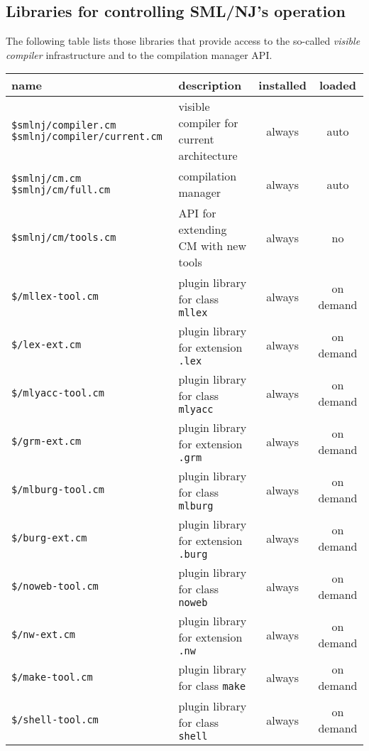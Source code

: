 \subsection{Libraries for controlling SML/NJ's operation}

The following table lists those libraries that provide access to the
so-called {\em visible compiler} infrastructure and to the compilation
manager API.

\begin{small}
\begin{center}
\begin{tabular}{p{2.3in}||p{2.5in}|c|c}
name & description & installed & loaded \\
\hline\hline
{\tt \$smlnj/compiler.cm} \newline
{\tt \$smlnj/compiler/current.cm} & visible compiler for current
architecture & always & auto \\
\hline\hline
{\tt \$smlnj/cm.cm} \newline
{\tt \$smlnj/cm/full.cm} & compilation manager & always & auto \\
\hline
{\tt \$smlnj/cm/tools.cm} & API for extending CM with new tools &
always & no \\
\hline\hline
{\tt \$/mllex-tool.cm} & plugin library for class {\tt mllex} & always
& on demand \\
\hline
{\tt \$/lex-ext.cm} & plugin library for extension {\tt .lex} & always
& on demand \\
\hline
{\tt \$/mlyacc-tool.cm} & plugin library for class {\tt mlyacc} &
always & on demand \\
\hline
{\tt \$/grm-ext.cm} & plugin library for extension {\tt .grm} & always
& on demand \\
\hline
{\tt \$/mlburg-tool.cm} & plugin library for class {\tt mlburg} &
always & on demand \\
\hline
{\tt \$/burg-ext.cm} & plugin library for extension {\tt .burg} &
always & on demand \\
\hline
{\tt \$/noweb-tool.cm} & plugin library for class {\tt noweb} & always
& on demand \\
\hline
{\tt \$/nw-ext.cm} & plugin library for extension {\tt .nw} & always &
on demand \\
\hline
{\tt \$/make-tool.cm} & plugin library for class {\tt make} & always &
on demand \\
\hline
{\tt \$/shell-tool.cm} & plugin library for class {\tt shell} & always
& on demand \\
\end{tabular}
\end{center}
\end{small}

